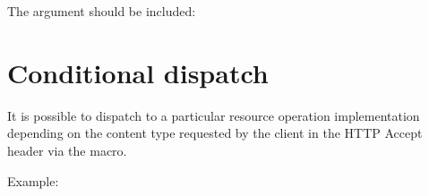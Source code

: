 \documentclass[letterpaper,10pt,english]{sphinxmanual}
\begin{document}
The  argument should be included:

\begin{sphinxVerbatim}[commandchars=\\\{\}]
  
      
            
\end{sphinxVerbatim}


\section{Conditional dispatch}
\label{\detokenize{api:conditional-dispatch}}
It is possible to dispatch to a particular resource operation implementation depending on the content type requested by the client in the HTTP Accept header via the {\hyperref[\detokenize{api:function:rest-server:implement-resource-operation-case}]{}} macro.

\begin{fulllineitems}
\label{\detokenize{api:function:rest-server:implement-resource-operation-case}}
\end{fulllineitems}


Example:
\end{document}
